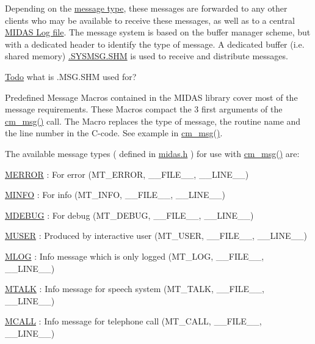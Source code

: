 Depending on the \hyperlink{F_Messaging_F_message_types}{message type}, these messages are forwarded to any other clients who may be available to receive these messages, as well as to a central \hyperlink{F_Messaging_F_Log_File}{MIDAS Log file}. The message system is based on the buffer manager scheme, but with a dedicated header to identify the type of message. A dedicated buffer (i.e. shared memory) \hyperlink{RC_odbedit_examples_RC_odbedit_create_ODB}{.SYSMSG.SHM} is used to receive and distribute messages.

\begin{Desc}
\item[\hyperlink{todo__todo000006}{Todo}]what is .MSG.SHM used for?\end{Desc}
\par
 \label{F_Messaging_idx_message_types}
\hypertarget{F_Messaging_idx_message_types}{}
 \label{F_Messaging_F_message_types}
\hypertarget{F_Messaging_F_message_types}{}
 Predefined Message Macros contained in the MIDAS library cover most of the message requirements. These Macros compact the 3 first arguments of the \hyperlink{group__msgfunctionc_gaac032ca2438c47466bfc9722de6746ea}{cm\_\-msg()} call. The Macro replaces the type of message, the routine name and the line number in the C-\/code. See example in \hyperlink{group__msgfunctionc_gaac032ca2438c47466bfc9722de6746ea}{cm\_\-msg()}.

The available message types ( defined in \hyperlink{midas_8h}{midas.h} ) for use with \hyperlink{group__msgfunctionc_gaac032ca2438c47466bfc9722de6746ea}{cm\_\-msg()} are:
\begin{DoxyItemize}
\item \hyperlink{group__mdefineh_gac2d967025ca0f84f611d568f4ede934a}{MERROR} : For error (MT\_\-ERROR, \_\-\_\-FILE\_\-\_\-, \_\-\_\-LINE\_\-\_\-)
\item \hyperlink{group__mdefineh_ga6e27d8876a43afce3ee4dd16527cbb9e}{MINFO} : For info (MT\_\-INFO, \_\-\_\-FILE\_\-\_\-, \_\-\_\-LINE\_\-\_\-)
\item \hyperlink{group__mdefineh_gad769dc7be0dc5189e019d56664a18655}{MDEBUG} : For debug (MT\_\-DEBUG, \_\-\_\-FILE\_\-\_\-, \_\-\_\-LINE\_\-\_\-)
\item \hyperlink{group__mdefineh_ga34e08186e736dbd7f0b61a23a8ad8d0f}{MUSER} : Produced by interactive user (MT\_\-USER, \_\-\_\-FILE\_\-\_\-, \_\-\_\-LINE\_\-\_\-)
\item \hyperlink{group__mdefineh_ga953a810cf5034c603bdcad8840223ddc}{MLOG} : Info message which is only logged (MT\_\-LOG, \_\-\_\-FILE\_\-\_\-, \_\-\_\-LINE\_\-\_\-)
\item \hyperlink{group__mdefineh_gad6a8d32f94873258d0eebcbe5b24a78e}{MTALK} : Info message for speech system (MT\_\-TALK, \_\-\_\-FILE\_\-\_\-, \_\-\_\-LINE\_\-\_\-)
\item \hyperlink{group__mdefineh_ga9f2fa3417c41f059c815b9c0eba73db2}{MCALL} : Info message for telephone call (MT\_\-CALL, \_\-\_\-FILE\_\-\_\-, \_\-\_\-LINE\_\-\_\-)
\end{DoxyItemize}

